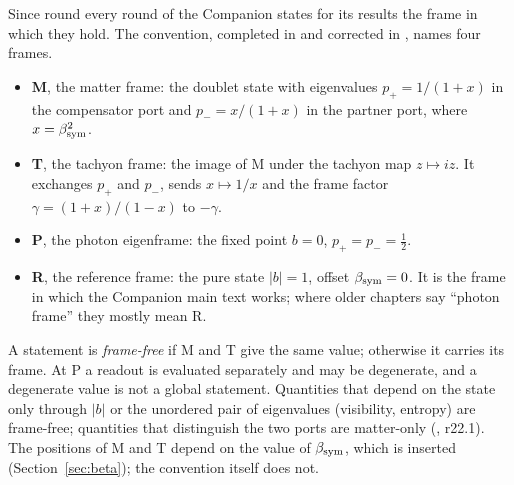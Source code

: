 Since round  every round of the Companion states for its results the frame in which they hold. The
convention, completed in  and corrected in , names four frames.
\begin{itemize}
\item \textbf{M}, the matter frame: the doublet state with eigenvalues $p_+=1/(1+x)$ in the compensator
  port and $p_-=x/(1+x)$ in the partner port, where $x=\beta_{\mathrm{sym}}^2$.
\item \textbf{T}, the tachyon frame: the image of M under the tachyon map $z\mapsto iz$. It exchanges
  $p_+$ and $p_-$, sends $x\mapsto1/x$ and the frame factor $\gamma=(1+x)/(1-x)$ to $-\gamma$.
\item \textbf{P}, the photon eigenframe: the fixed point $b=0$, $p_+=p_-=\tfrac12$.
\item \textbf{R}, the reference frame: the pure state $|b|=1$, offset $\beta_{\mathrm{sym}}=0$. It is the frame in
  which the Companion main text works; where older chapters say ``photon frame'' they mostly mean R.
\end{itemize}
A statement is \emph{frame-free} if M and T give the same value; otherwise it carries its frame. At P
a readout is evaluated separately and may be degenerate, and a degenerate value is not a global
statement. Quantities that depend on the state only through $|b|$ or the unordered pair of eigenvalues
(visibility, entropy) are frame-free; quantities that distinguish the two ports are matter-only
(, r22.1). The positions of M and T depend on the value of $\beta_{\mathrm{sym}}$, which is inserted
(Section~\ref{sec:beta}); the convention itself does not.

